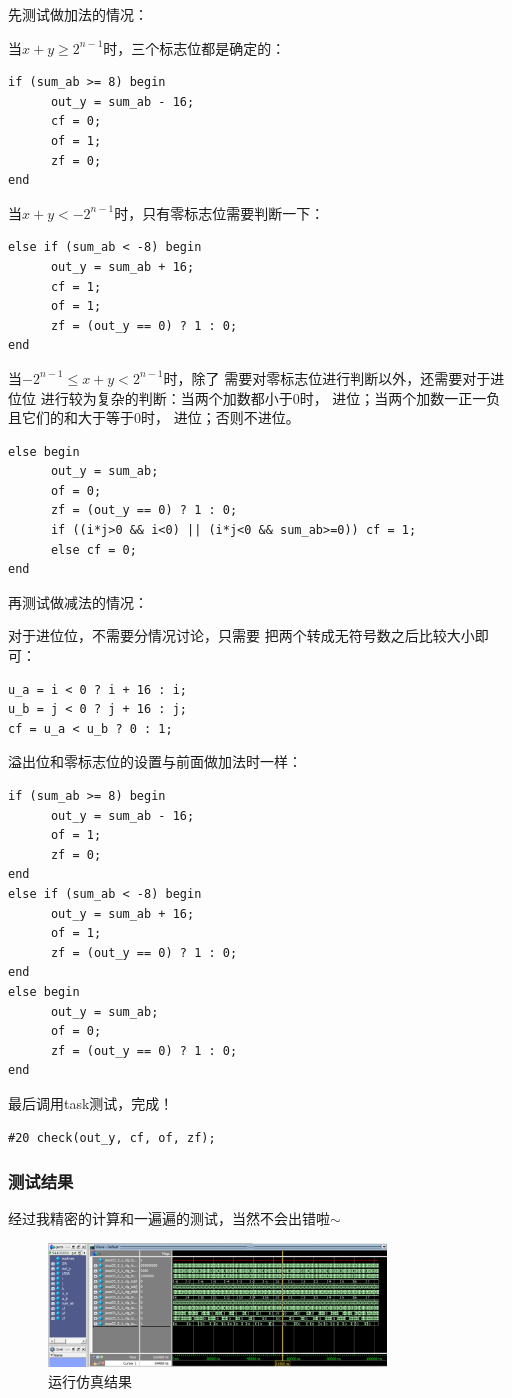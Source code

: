 \documentclass[12pt,a4paper,UTF8]{article}
\begin{document}
先测试做加法的情况：

当$x+y \geqslant 2^{n-1}$时，三个标志位都是确定的：
\begin{lstlisting}[style=verilog-style]
if (sum_ab >= 8) begin
      out_y = sum_ab - 16;
      cf = 0;
      of = 1;
      zf = 0;
end
\end{lstlisting}

当$x+y < -2^{n-1}$时，只有零标志位需要判断一下：
\begin{lstlisting}[style=verilog-style]
else if (sum_ab < -8) begin
      out_y = sum_ab + 16;
      cf = 1;
      of = 1;
      zf = (out_y == 0) ? 1 : 0;
end      
\end{lstlisting}

当$-2^{n-1}\leqslant x+y < 2^{n-1}$时，除了
需要对零标志位进行判断以外，还需要对于进位位
进行较为复杂的判断：当两个加数都小于0时，
进位；当两个加数一正一负且它们的和大于等于0时，
进位；否则不进位。
\begin{lstlisting}[style=verilog-style]
else begin
      out_y = sum_ab;
      of = 0;
      zf = (out_y == 0) ? 1 : 0;
      if ((i*j>0 && i<0) || (i*j<0 && sum_ab>=0)) cf = 1;
      else cf = 0; 
end    
\end{lstlisting}

再测试做减法的情况：

对于进位位，不需要分情况讨论，只需要
把两个转成无符号数之后比较大小即可：
\begin{lstlisting}[style=verilog-style]
u_a = i < 0 ? i + 16 : i;
u_b = j < 0 ? j + 16 : j;
cf = u_a < u_b ? 0 : 1;
\end{lstlisting}

溢出位和零标志位的设置与前面做加法时一样：
\begin{lstlisting}[style=verilog-style]
if (sum_ab >= 8) begin
      out_y = sum_ab - 16;
      of = 1;
      zf = 0;
end
else if (sum_ab < -8) begin
      out_y = sum_ab + 16;
      of = 1;
      zf = (out_y == 0) ? 1 : 0;
end
else begin
      out_y = sum_ab;
      of = 0;
      zf = (out_y == 0) ? 1 : 0; 
end
\end{lstlisting}

最后调用task测试，完成！
\begin{lstlisting}[style=verilog-style]
#20 check(out_y, cf, of, zf);
\end{lstlisting}

\subsubsection{测试结果}
经过我精密的计算和一遍遍的测试，当然不会出错啦$\sim$
\begin{figure}[H]
  \centering
  \includegraphics[width=0.8\textwidth]{03_3_1sim.JPG}
  \caption{运行仿真结果}
  \label{sim}
\end{figure}
\end{document}
